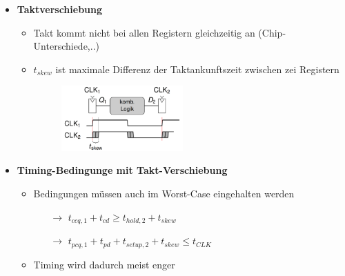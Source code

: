 \documentclass[11pt,a4paper]{article}
\begin{document}
\begin{itemize}
\pagebreak	
	
\item \textbf{Taktverschiebung}
	\begin{itemize}
	\item Takt kommt nicht bei allen Registern gleichzeitig an (Chip-Unterschiede,..)
	\item $t_{skew}$ ist maximale Differenz der Taktankunftszeit zwischen zei Registern
	\item[] \begin{figure}[H]
				\begin{center}
				\includegraphics[height=2.5cm]{Bilder/tskew}
				\end{center}
			\end{figure}
	\end{itemize}
	
\item \textbf{Timing-Bedingunge mit Takt-Verschiebung}
	\begin{itemize}
	\item Bedingungen müssen auch im Worst-Case eingehalten werden
		\begin{itemize}
		\item[$\rightarrow$] $t_{ccq,1}+t_{cd} \geq t_{hold,2} + t_{skew}$
		\item[$\rightarrow$] $t_{pcq,1}+t_{pd} + t_{setup,2} + t_{skew} \leq t_{CLK}$
		\end{itemize}
	
	\item Timing wird dadurch meist enger
	\end{itemize}
	

\end{itemize}
\end{document}
